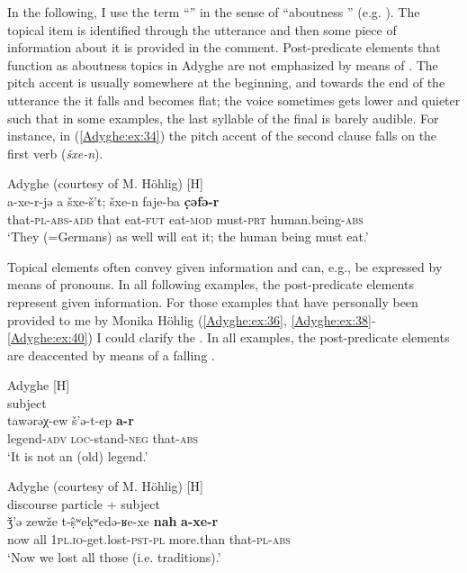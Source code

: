\documentclass[output=paper,colorlinks,citecolor=brown, draft]{langscibook}
\begin{document}
In the following, I use the term ``'' in the sense of ``aboutness '' (e.g. \citealt{krifka2007basic}). The topical item is identified through the utterance and then some piece of information about it is provided in the comment. Post-predicate elements that function as aboutness topics in Adyghe are not emphasized by means of . The pitch accent is usually somewhere at the beginning, and  towards the end of the utterance the  it falls and becomes flat; the voice sometimes gets lower and quieter such that in some examples, the last syllable of the final  is barely audible. For instance, in (\ref{Adyghe:ex:34}) the pitch accent of the second clause falls on the first verb (\textit{šxe-n}).

\ea\label{Adyghe:ex:34}
Adyghe (courtesy of M. Höhlig) [H] \\
\gll a-xe-r-jə a šxe-š't; šxe-n faje-ba \textbf{c̣əfə-r} \\
that\textsc{-pl}\textsc{-abs}\textsc{-add} that eat\textsc{-fut} eat\textsc{-mod} must\textsc{-prt} human.being\textsc{-abs} \\
 `They (=Germans) as well will eat it; the human being must eat.' 
\z
 
Topical elements often convey given information and can, e.g., be expressed by means of pronouns. In all following examples, the post-predicate elements represent given information. For those examples that have personally been provided to me by Monika Höhlig (\ref{Adyghe:ex:36}, \ref{Adyghe:ex:38}-\ref{Adyghe:ex:40}) I could clarify the . In all examples, the post-predicate elements are deaccented by means of a falling . 

\ea\label{Adyghe:ex:35}
Adyghe \citep[236]{hohlig1997kontaktbedingter} [H] \\
subject \\
\gll tawərəχ-ew š'ə-t-ep \textbf{a-r} \\
legend\textsc{-adv} \textsc{loc-}stand\textsc{-neg} that\textsc{-abs} \\
 `It is not an (old) legend.' 
\z

\ea\label{Adyghe:ex:36}
Adyghe (courtesy of M. Höhlig) [H] \\
discourse particle + subject \\
\gll ǯ'ə zewže t-ṣ̂ʷeḳʷedə-ʁe-xe \textbf{nah} \textbf{a-xe-r} \\
now all \textsc{1pl.}\textsc{io-}get.lost\textsc{-pst}\textsc{-pl} more.than that\textsc{-pl}\textsc{-abs} \\
 `Now we lost all those (i.e. traditions).'
\z
\end{document}
